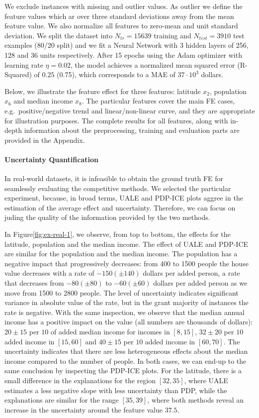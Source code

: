\documentclass[twoside]{article}
\begin{document}
We exclude instances with missing and outlier values. As outlier we
define the feature values which ar over three standard deviations away
from the mean feature value. We also normalize all features to
zero-mean and unit standard deviation. We split the dataset into
\(N_{tr} = 15639\) training and \(N_{test} = 3910\) test examples
(80/20 split) and we fit a Neural Network with 3 hidden layers of 256,
128 and 36 units respectively. After 15 epochs using the Adam
optimizer with learning rate \(\eta = 0.02\), the model achieves a
normalized mean squared error (R-Squared) of \(0.25\) (0.75), which
corresponds to a MAE of \(37 \cdot 10^3\) dollars.

Below, we illustrate the feature effect for three features: latitude
\(x_2\), population \(x_6\) and median income \(x_8\). The particular
features cover the main FE cases, e.g.~positive/negative trend and
linear/non-linear curve, and they are appropriate for illustration
purposes. The complete results for all features, along with in-depth
information about the preprocessing, training and evaluation parts are
provided in the Appendix.

\paragraph{Uncertainty Quantification}

In real-world datasets, it is infeasible to obtain the ground truth FE
for seamlessly evaluating the competitive methods. We selected the
particular experiment, because, in broad terms, UALE and PDP-ICE plots
aggree in the estimation of the average effect and
uncertainty. Therefore, we can focus on juding the quality of the
information provided by the two methods.

In Figure\ref{fig:ex-real-1}, we observe, from top to bottom, the
effects for the latitude, population and the median income. The effect
of UALE and PDP-ICE are similar for the population and the median
income. The population has a negative impact that progressively
decreases: from 400 to 1500 people the house value decreases with a
rate of \(-150 (\pm 140)\) dollars per added person, a rate that
decreases from \(-80 (\pm 80)\) to \(-60 (\pm 60)\) dollars per added
person as we move from 1500 to 2800 people. The level of uncertainty
indicates significant variance in absolute value of the rate, but in
the grant majority of instances the rate is negative. With the same
inspection, we observe that the median annual income has a positive
impact on the value (all numbers are thousands of dollars):
\(20\pm 15\) per \(10\) of added median income for incomes in
\([8, 15]\), \(32 \pm 20\) per \(10\) added income in \([15, 60]\) and
\(40 \pm 15\) per \(10\) added income in \([60, 70]\). The uncertainty
indicates that there are less heterogeneous effects about the median
income compared to the number of people. In both cases, we can end-up
to the same conclusion by inspecting the PDP-ICE plots. For the
latitude, there is a small difference in the explanations for the
region \([32, 35]\), where UALE estimates a less negative slope with
less uncertainty than PDP, while the explanations are similar for the
range \([35,39]\), where both methods reveal an increase in the
uncertainty around the feature value \(37.5\).
\end{document}
